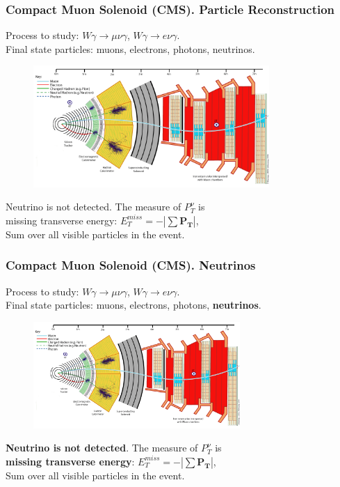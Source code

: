 \begin{frame}\frametitle{Compact Muon Solenoid (CMS). Particle Reconstruction}
\scriptsize
Process to study: $W\gamma\rightarrow\mu\nu\gamma$, $W\gamma\rightarrow e\nu\gamma$.\\
Final state particles: muons, electrons, photons, neutrinos.\\
\begin{figure}[htb]
  \begin{center}
    {\includegraphics[width=0.80\textwidth]{../figs/Exp/CMS_Slice.png}}
  \end{center}
\end{figure}

\scriptsize
Neutrino is not detected. The measure of $P_T^{\nu}$ is\\ 
missing transverse energy: $  E_T^{miss} = - | \sum \mathbf{P_T} |$,\\
Sum over all visible particles in the event. 

\end{frame}%

\begin{frame}\frametitle{Compact Muon Solenoid (CMS). Neutrinos}
\scriptsize
Process to study: $W\gamma\rightarrow\mu\nu\gamma$, $W\gamma\rightarrow e\nu\gamma$.\\
Final state particles: muons, electrons, photons, {\color{blue}\bfseries{neutrinos}}.\\
\begin{figure}[htb]
  \begin{center}
    {\includegraphics[width=0.70\textwidth]{../figs/Exp/CMS_Slice.png}}
  \end{center}
\end{figure}

\scriptsize
{\color{blue}\bfseries{Neutrino is not detected}}. The measure of $P_T^{\nu}$ is\\ 
{\bfseries{missing transverse energy}}: $  E_T^{miss} = - | \sum \mathbf{P_T} |$,\\
Sum over all visible particles in the event. 

\end{frame}%


